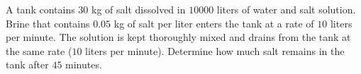 \label{problemDFQseparable-mixing-problem-1}
A tank contains $30$ kg of salt dissolved in $10000$ liters of water and salt solution. Brine that contains $0.05$ kg of salt per liter enters the tank at a rate of $10$ liters per minute. The solution is kept thoroughly mixed and drains from the tank at the same rate ($10$ liters per minute). Determine how much salt remains in the tank after $45$ minutes.